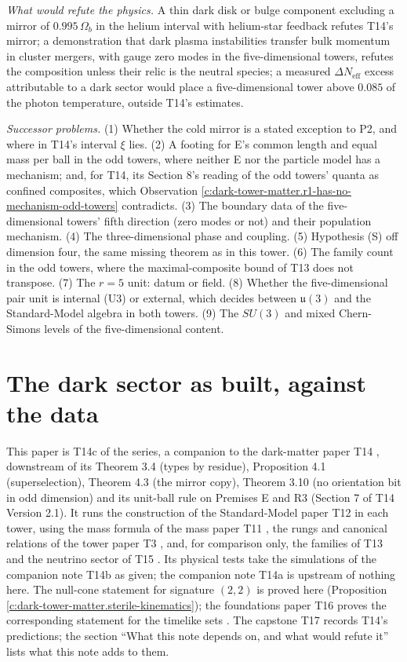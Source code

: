 \documentclass[11pt]{article}
\theoremstyle{definition}
\theoremstyle{plain}
\providecommand{\Neff}{}\renewcommand{\Neff}{N_{\mathrm{eff}}}
\providecommand{\uu}{}\renewcommand{\uu}{\mathfrak{u}}
\begin{document}
\emph{What would refute the physics.} A thin dark disk or bulge component excluding a mirror of $0.995\,\Omega_{b}$ in the helium interval with helium-star feedback refutes T14's mirror; a demonstration that dark plasma instabilities transfer bulk momentum in cluster mergers, with gauge zero modes in the five-dimensional towers, refutes the composition unless their relic is the neutral species; a measured $\Delta\Neff$ excess attributable to a dark sector would place a five-dimensional tower above $0.085$ of the photon temperature, outside T14's estimates.

\emph{Successor problems.} (1) Whether the cold mirror is a stated exception to P2, and where in T14's interval $\xi$ lies. (2) A footing for E's common length and equal mass per ball in the odd towers, where neither E nor the particle model has a mechanism; and, for T14, its Section 8's reading of the odd towers' quanta as confined composites, which Observation \ref{c:dark-tower-matter.r1-has-no-mechanism-odd-towers} contradicts. (3) The boundary data of the five-dimensional towers' fifth direction (zero modes or not) and their population mechanism. (4) The three-dimensional phase and coupling. (5) Hypothesis (S) off dimension four, the same missing theorem as in this tower. (6) The family count in the odd towers, where the maximal-composite bound of T13 \cite[Conj.~3.1]{ButlerT13} does not transpose. (7) The $r = 5$ unit: datum or field. (8) Whether the five-dimensional pair unit is internal (U3) or external, which decides between $\uu(3)$ and the Standard-Model algebra in both towers. (9) The $SU(3)$ and mixed Chern-Simons levels of the five-dimensional content.

\section{The dark sector as built, against the data}

\label{c:note.dark-tower-matter.setting-position-series}
This paper is T14c of the series, a companion to the dark-matter paper T14 \cite{ButlerT14}, downstream of its Theorem 3.4 (types by residue), Proposition 4.1 (superselection), Theorem 4.3 (the mirror copy), Theorem 3.10 (no orientation bit in odd dimension) and its unit-ball rule on Premises E and R3 (Section 7 of T14 Version 2.1). It runs the construction of the Standard-Model paper T12 \cite{ButlerT12} in each tower, using the mass formula of the mass paper T11 \cite{ButlerT11}, the rungs and canonical relations of the tower paper T3 \cite{ButlerT3}, and, for comparison only, the families of T13 \cite{ButlerT13} and the neutrino sector of T15 \cite{ButlerT15}. Its physical tests take the simulations of the companion note T14b \cite{ButlerT14b} as given; the companion note T14a \cite{ButlerT14a} is upstream of nothing here. The null-cone statement for signature $(2,2)$ is proved here (Proposition \ref{c:dark-tower-matter.sterile-kinematics}); the foundations paper T16 proves the corresponding statement for the timelike sets \cite{ButlerT16}. The capstone T17 \cite{ButlerT17} records T14's predictions; the section ``What this note depends on, and what would refute it'' lists what this note adds to them.
\end{document}

